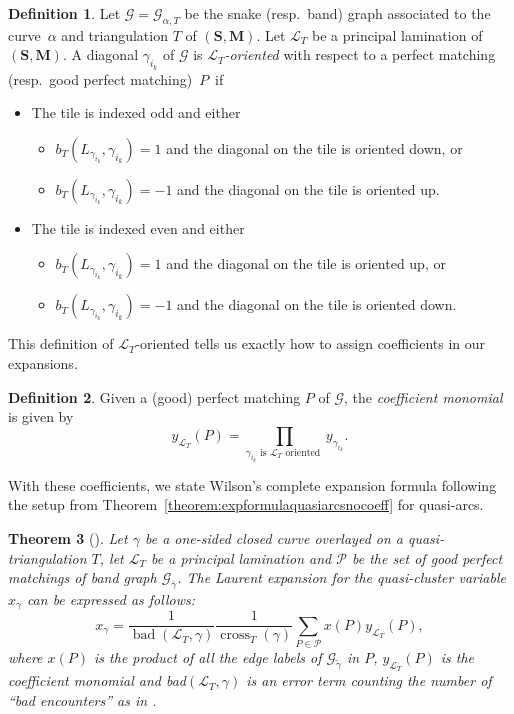 \documentclass[pdftex]{sigma}
\numberwithin{equation}{section}
\newtheorem{Theorem}{Theorem}[section]
\theoremstyle{definition}
\newtheorem{Definition}[Theorem]{Definition}
\newcommand{\SM}{(\mathbf{S}, \mathbf{M})}
\begin{document}
\begin{Definition}\label{definition:L_Toriented}
Let $\mathcal{G} = \mathcal{G}_{\alpha, T}$ be the snake (resp.\ band) graph associated to the curve~$\alpha$ and triangulation $T$ of $\SM$. Let $\mathcal{L}_T$ be a principal lamination of~$\SM$. A diagonal $\gamma_{i_k}$ of $\mathcal{G}$ is \emph{$\mathcal{L}_T$-oriented} with respect to a perfect matching (resp.\ good perfect matching)~$P$~if
\begin{itemize}\itemsep=0pt
 \item The tile is indexed odd and either
 \begin{itemize}\itemsep=0pt
 \item $b_T(L_{\gamma_{i_k}}, \gamma_{i_k}) = 1$ and the diagonal on the tile is oriented down, or
 \item $b_T(L_{\gamma_{i_k}}, \gamma_{i_k}) = -1$ and the diagonal on the tile is oriented up.
 \end{itemize}
 \item The tile is indexed even and either
 \begin{itemize}\itemsep=0pt
 \item $b_T(L_{\gamma_{i_k}}, \gamma_{i_k}) = 1$ and the diagonal on the tile is oriented up, or
 \item $b_T(L_{\gamma_{i_k}}, \gamma_{i_k}) = -1$ and the diagonal on the tile is oriented down.
 \end{itemize}
\end{itemize}
\end{Definition}

This definition of $\mathcal{L}_T$-oriented tells us exactly how to assign coefficients in our expansions.
\begin{Definition}\label{definition:wilsoncoefficients}
Given a (good) perfect matching $P$ of $\mathcal{G}$, the \emph{coefficient monomial} is given by
\[y_{\mathcal{L}_T}(P) = \prod_{\gamma_{i_k} \text{ is } \mathcal{L}_T \text{ oriented }} y_{\gamma_{i_k}}.\]
\end{Definition}

With these coefficients, we state Wilson's complete expansion formula \cite[Theorem 5.44]{Wil19} following the setup from Theorem~\ref{theorem:expformulaquasiarcsnocoeff} for quasi-arcs.

\begin{Theorem}[\cite{Wil19}]
 Let $\gamma$ be a one-sided closed curve overlayed on a quasi-triangulation $T$, let $\mathcal{L}_T$ be a principal lamination and $\mathcal{P}$ be the set of good perfect matchings of band graph $\mathcal{G}_{\overline{\gamma}}$. The Laurent expansion for the quasi-cluster variable $x_\gamma$ can be expressed as follows:
 \[x_\gamma = \frac{1}{\operatorname{bad}(\mathcal{L}_T,\gamma)}\frac{1}{\operatorname{cross}_T(\gamma)} \sum_{P \in \mathcal{P}} x(P) y_{\mathcal{L}_T}(P),\]
 where $x(P)$ is the product of all the edge labels of $\mathcal{G}_{\tilde{\gamma}}$ in $P$, $y_{\mathcal{L}_T}(P)$ is the coefficient monomial and bad$(\mathcal{L}_T,\gamma)$ is an error term counting the number of ``bad encounters'' as in {\rm\cite[\emph{Definition}~5.40]{Wil19}}.
\end{Theorem}
\end{document}
